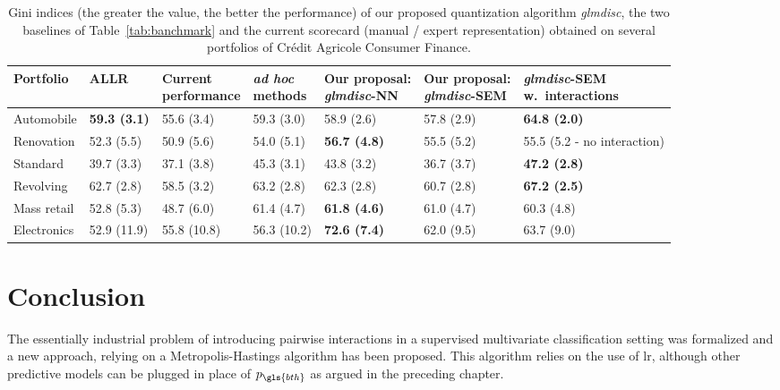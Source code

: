 \begin{table}
    \centering
        \caption{Gini indices (the greater the value, the better the performance) of our proposed quantization algorithm \textit{glmdisc}, the two baselines of Table~\ref{tab:banchmark} and the current scorecard (manual / expert representation) obtained on several portfolios of Cr\'edit Agricole Consumer Finance.}
    \label{tab:real_data_inter}
\begin{footnotesize}
\begin{tabular}{lllllll}
Portfolio & ALLR & \makecell{Current\\performance} & \makecell{\textit{ad hoc}\\methods} & \makecell{Our proposal:\\ \textit{glmdisc}-NN} & \makecell{Our proposal:\\ \textit{glmdisc}-SEM} & \makecell{\textit{glmdisc}-SEM\\ w.\ interactions} \\
\hline
Automobile & \bf{59.3} (3.1) & 55.6 (3.4) & 59.3 (3.0) & 58.9 (2.6) & 57.8 (2.9) & \bf{64.8} (2.0) \\
Renovation & 52.3 (5.5) & 50.9 (5.6) & 54.0 (5.1) & \bf{56.7} (4.8) & 55.5 (5.2) & 55.5 (5.2 - no interaction) \\
Standard & 39.7 (3.3) & 37.1 (3.8) & 45.3 (3.1) & 43.8 (3.2) & 36.7 (3.7) & \bf{47.2} (2.8) \\
Revolving & 62.7 (2.8) & 58.5 (3.2) & 63.2 (2.8) & 62.3 (2.8) & 60.7 (2.8) & \bf{67.2} (2.5) \\
Mass retail & 52.8 (5.3) & 48.7 (6.0) & 61.4 (4.7) & \bf{61.8} (4.6) & 61.0 (4.7) & 60.3 (4.8) \\
Electronics & 52.9 (11.9) & 55.8 (10.8) & 56.3 (10.2)  & \bf{72.6} (7.4) & 62.0 (9.5) & 63.7 (9.0) \\
\end{tabular}
\end{footnotesize}
\end{table}




\section{Conclusion} \label{sec:ccl}

The essentially industrial problem of introducing pairwise interactions in a supervised multivariate classification setting was formalized and a new approach, relying on a Metropolis-Hastings algorithm has been proposed. This algorithm relies on the use of \gls{lr}, although other predictive models can be plugged in place of $p_{\gls{bth}}$ as argued in the preceding chapter.

